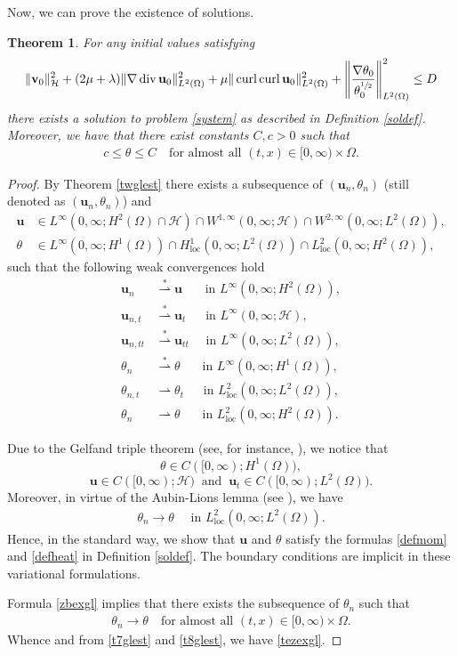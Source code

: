 \documentclass[11pt]{article}
\numberwithin{equation}{section}
\theoremstyle{plain}
\newtheorem{tw}[defi]{Theorem}
\newcommand\bb[1]{\mathbf{#1}}
\newcommand{\tn}{\Omega}
\newcommand{\htwo}{H^2(\Omega)}
\renewcommand{\hom}{H^1(\tn)}
\newcommand{\ld}{L^2(\Omega)}
\newcommand{\loc}{\operatorname{loc}}
\newcommand{\sul}{\sfrac{1}{2}}
\renewcommand{\div}{\operatorname{div}}
\DeclareMathOperator{\curl}{curl}
\newcommand{\initcond}{\|\bb{v}_0\|^2_{\H}+(2\mu+\lambda)\|\nabla\div\bb u_0\|^2_{\ld}+\mu\|\curl\curl\bb u_0\|_{\ld}^2+\left\|\frac{\nabla\theta_0}{{\theta^{\sul}_0}}\right\|^2_{\ld}\leq D}
\renewcommand{\H}{\mathcal{H}}
\begin{document}
Now, we can prove the existence of solutions.
\begin{tw}
For any initial values satisfying
\begin{align*}
\initcond
\end{align*} there exists a solution to problem \eqref{system} as described in Definition \ref{soldef}. Moreover, we have that there exist constants $C,c>0$ such that
\begin{align}\label{tezexgl}
c\leq\theta\leq C\quad\textrm{for almost all }(t,x)\in [0,\infty)\times\Omega.
\end{align}
\end{tw}
\begin{proof}
By Theorem \ref{twglest} there exists a subsequence of $(\bb u_n,\theta_n)$ (still denoted as $(\bb u_n,\theta_n)$) and
\begin{align*}
\bb u&\in L^{\infty}(0,\infty;\htwo\cap\H)\cap W^{1,\infty}(0,\infty;\H)\cap W^{2,\infty}(0,\infty;\ld),\\
\theta&\in L^{\infty}(0,\infty;\hom)\cap H^1_{\loc}(0,\infty;\ld)\cap L^2_{\loc}(0,\infty;\htwo),
\end{align*}
such that the following weak convergences hold
\begin{align*}
\bb u_n&\stackrel *{\rightharpoonup}\bb u\quad\ \;  \textrm{ in }L^{\infty}(0,\infty;\htwo),\\
\bb u_{n,t}&\stackrel *{\rightharpoonup}\bb u_t\quad\ \textrm{ in }L^{\infty}(0,\infty;\H),\\
\bb u_{n,tt}&\stackrel *{\rightharpoonup}\bb u_{tt}\quad \textrm{ in }L^{\infty}(0,\infty;\ld),\\
\theta_{n}&\stackrel*{\rightharpoonup}\theta\quad\ \ \textrm{ in }L^{\infty}(0,\infty;\hom),\\
\theta_{n,t}&\stackrel{}{\rightharpoonup}\theta_t\quad\ \textrm{ in }L^2_{\loc}(0,\infty;\ld),\\
\theta_{n}&\stackrel{}{\rightharpoonup}\theta\quad\ \ \textrm{ in }L^2_{\loc}(0,\infty;\htwo).
\end{align*}

Due to the Gelfand triple theorem (see, for instance, \cite{Boyer, Evans}), we notice that
\[
\theta\in C([0,\infty);\hom),
\]
\[
\bb u\in C([0,\infty);\H)\;\;\mbox{and}\;\;\bb u_t\in C([0,\infty);\ld).
\]
Moreover, in virtue of the Aubin-Lions lemma (see \cite{Boyer}), we have
\begin{align}\label{zbexgl}
\theta_n\to\theta\quad\textrm{ in }L^{2}_{\loc}(0,\infty;\ld).
\end{align}
Hence, in the standard way, we show that $\bb u$ and $\theta$ satisfy the formulas \eqref{defmom} and \eqref{defheat} in Definition \ref{soldef}. The boundary conditions are implicit in these variational formulations. 

Formula \eqref{zbexgl} implies that there exists the subsequence of $\theta_n$ such that 
\begin{align*}
\theta_n\to\theta \quad \textrm{for almost all }(t,x)\in [0,\infty)\times\Omega.
\end{align*}
Whence and from \eqref{t7glest} and \eqref{t8glest}, we have \eqref{tezexgl}.
\end{proof}
\end{document}
